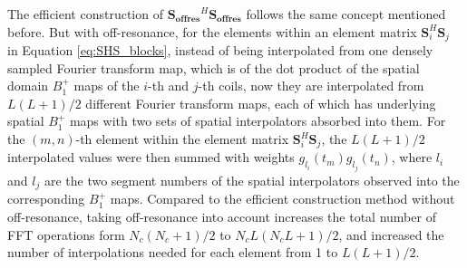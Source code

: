 The efficient construction of $\bm{S_{offres}}^{H}\bm{S_{offres}}$ follows the same concept mentioned before. 
But with off-resonance, for the elements within an element matrix $\bm{S}_i^{H}\bm{S}_j$ in Equation \ref{eq:SHS_blocks}, instead of being interpolated from one densely sampled Fourier transform map, which is of the dot product of the spatial domain $B_1^+$ maps of the $i$-th and $j$-th coils, now they are interpolated from $L(L+1)/2$ different Fourier transform maps, each of which has underlying spatial $B_1^+$ maps with two sets of spatial interpolators absorbed into them. For the $(m,n)$-th element within the element matrix $\bm{S}_i^{H}\bm{S}_j$, the $L(L+1)/2$ interpolated values were then summed with weights $g_{l_i}(t_m)g_{l_j}(t_n)$, where $l_i$ and $l_j$ are the two segment numbers of the spatial interpolators observed into the corresponding $B_1^+$ maps. 
Compared to the efficient construction method without off-resonance, taking off-resonance into account increases the total number of FFT operations form $N_c(N_c+1)/2$ to $N_cL(N_cL+1)/2$, and increased the number of interpolations needed for each element from 1 to $L(L+1)/2$.  



